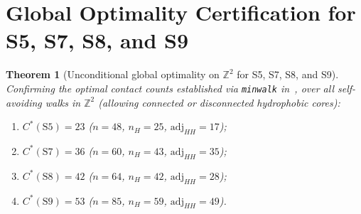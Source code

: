 \documentclass[11pt]{article}
\newtheorem{theorem}{Theorem}
\newcommand{\Z}{\mathbb{Z}}
\begin{document}
\section{Global Optimality Certification for S5, S7, S8, and S9}\label{sec:opt}

\begin{theorem}[Unconditional global optimality on $\Z^2$ for S5, S7, S8, and S9]\label{thm:opt}
Confirming the optimal contact counts established via \textup{\texttt{minwalk}} in~\cite{giaquinta2013}, over all self-avoiding walks in $\Z^2$ (allowing connected or disconnected hydrophobic cores):
\begin{enumerate}[leftmargin=*,topsep=2pt,itemsep=1pt]
\item $C^*(\mathrm{S5}) = 23$ ($n = 48$, $n_H = 25$, $\mathrm{adj}_{HH} = 17$);
\item $C^*(\mathrm{S7}) = 36$ ($n = 60$, $n_H = 43$, $\mathrm{adj}_{HH} = 35$);
\item $C^*(\mathrm{S8}) = 42$ ($n = 64$, $n_H = 42$, $\mathrm{adj}_{HH} = 28$);
\item $C^*(\mathrm{S9}) = 53$ ($n = 85$, $n_H = 59$, $\mathrm{adj}_{HH} = 49$).
\end{enumerate}
\end{theorem}
\end{document}
